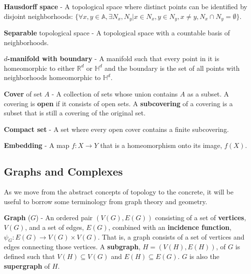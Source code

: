 \begin{defn}
  \textbf{Hausdorff space} - A topological space where distinct points can
  be identified by disjoint neighborhoods: $\{\forall x,y \in \mathbb{A},
  \exists N_x,N_y | x \in N_x, y \in N_y, x \neq y, N_x \cap N_y = \emptyset\}$.
\end{defn}
\begin{defn}
  \textbf{Separable} topological space - A topological space with a countable
  basis of neighborhoods.
\end{defn}
\begin{defn}
  \textbf{$d$-manifold with boundary} - A manifold such that every point in
  it is homeomorphic to either $\mathbb{R}^d$ or $\mathbb{H}^d$ and the boundary
  is the set of all points with neighborhoods homeomorphic to $\mathbb{H}^d$.
\end{defn}
\begin{defn}
  \textbf{Cover} of set $A$ - A collection of sets whose union contains $A$
  as a subset. A covering is \textbf{open} if it consists of open sets. A
  \textbf{subcovering} of a covering is a subset that is still a covering of the
  original set.
\end{defn}

\begin{defn}
  \textbf{Compact set} - A set where every open cover contains a finite
  subcovering.
\end{defn}

\begin{defn}
  \textbf{Embedding} - A map $f : X \rightarrow Y$ that is a homeomorphism onto
  its image, $f(X)$.
\end{defn}

\subsection{Graphs and Complexes}

As we move from the abstract concepts of topology to the concrete, it will be useful to borrow some terminology from graph theory and geometry.

\begin{defn}
  \textbf{Graph} ($G$) - An ordered pair $(V(G),E(G))$ consisting of a set of
  \textbf{vertices}, $V(G)$, and a set of edges, $E(G)$, combined with an
  \textbf{incidence function}, $\psi_G : E(G) \rightarrow V(G) \times V(G)$.
  That is, a graph consists of a set of vertices and edges connecting those
  vertices. A \textbf{subgraph}, $H = (V(H),E(H))$, of $G$ is defined such that
  $V(H) \subseteq V(G)$ and $E(H) \subseteq E(G)$. $G$ is also the
  \textbf{supergraph} of $H$.
\end{defn}


